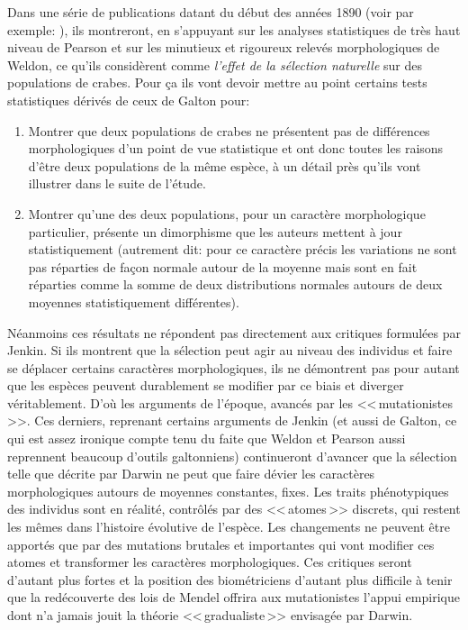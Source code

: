 Dans une série de publications datant du début des années 1890 (voir par exemple: \cite{weldon1893certaincorrelatedvariationsincrangonvulgaris}), ils montreront, en s'appuyant sur les analyses statistiques de très haut niveau de Pearson et sur les minutieux et rigoureux relevés morphologiques de Weldon, ce qu'ils considèrent comme \emph{l'effet de la sélection naturelle} sur des populations de crabes. Pour ça ils vont devoir mettre au point certains tests statistiques dérivés de ceux de Galton pour: 
\begin{enumerate}
	\item Montrer que deux populations de crabes ne présentent pas de différences morphologiques d'un point de vue statistique et ont donc toutes les raisons d'être deux populations de la même espèce, à un détail près qu'ils vont illustrer dans le suite de l'étude.
	\item Montrer qu'une des deux populations, pour un caractère morphologique particulier, présente un dimorphisme que les auteurs mettent à jour statistiquement (autrement dit: pour ce caractère précis les variations ne sont pas réparties de façon normale autour de la moyenne mais sont en fait réparties comme la somme de deux distributions normales autours de deux moyennes statistiquement différentes).
\end{enumerate}

Néanmoins ces résultats ne répondent pas directement aux critiques formulées par Jenkin. Si ils montrent que la sélection peut agir au niveau des individus et faire se déplacer certains caractères morphologiques, ils ne démontrent pas pour autant que les espèces peuvent durablement se modifier par ce biais et diverger véritablement. D'où les arguments de l'époque, avancés par les <<\,mutationistes\,>>. Ces derniers, reprenant certains arguments de Jenkin (et aussi de Galton, ce qui est assez ironique compte tenu du faite que Weldon et Pearson aussi reprennent beaucoup d'outils galtonniens) continueront d'avancer que la sélection telle que décrite par Darwin ne peut que faire dévier les caractères morphologiques autours de moyennes constantes, fixes. Les traits phénotypiques des individus sont en réalité, contrôlés par des <<\,atomes\,>> discrets, qui restent les mêmes dans l'histoire évolutive de l'espèce. Les changements ne peuvent être apportés que par des mutations brutales et importantes qui vont modifier ces atomes et transformer les caractères morphologiques. Ces critiques seront d'autant plus fortes et la position des biométriciens d'autant plus difficile à tenir que la redécouverte des lois de Mendel offrira aux mutationistes l'appui empirique dont n'a jamais jouit la théorie <<\,gradualiste\,>> envisagée par Darwin.

